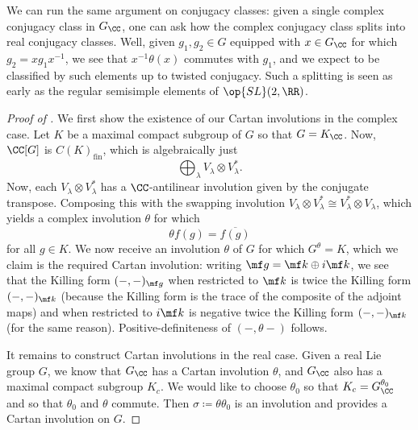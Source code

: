 \documentclass[../notes.tex]{subfiles}
\begin{document}
\begin{example}
	We can run the same argument on conjugacy classes: given a single complex conjugacy class in $G_\CC$, one can ask how the complex conjugacy class splits into real conjugacy classes. Well, given $g_1,g_2\in G$ equipped with $x\in G_\CC$ for which $g_2=xg_1x^{-1}$, we see that $x^{-1}\theta(x)$ commutes with $g_1$, and we expect to be classified by such elements up to twisted conjugacy. Such a splitting is seen as early as the regular semisimple elements of $\op{SL}(2,\RR)$.
\end{example}
\begin{proof}[Proof of ]
	We first show the existence of our Cartan involutions in the complex case. Let $K$ be a maximal compact subgroup of $G$ so that $G=K_\CC$. Now, $\CC[G]$ is $C(K)_{\mathrm{fin}}$, which is algebraically just
	\[\bigoplus_\lambda V_\lambda\otimes V_\lambda^*.\]
	Now, each $V_\lambda\otimes V_\lambda^*$ has a $\CC$-antilinear involution given by the conjugate transpose. Composing this with the swapping involution $V_\lambda\otimes V_\lambda^*\cong V_\lambda^*\otimes V_\lambda$, which yields a complex involution $\theta$ for which
	\[\theta f(g)=\overline{f(g)}\]
	for all $g\in K$. We now receive an involution $\theta$ of $G$ for which $G^\theta=K$, which we claim is the required Cartan involution: writing $\mf g=\mf k\oplus i\mf k$, we see that the Killing form $(-,-)_{\mf g}$ when restricted to $\mf k$ is twice the Killing form $(-,-)_{\mf k}$ (because the Killing form is the trace of the composite of the adjoint maps) and when restricted to $i\mf k$ is negative twice the Killing form $(-,-)_{\mf k}$ (for the same reason). Positive-definiteness of $(-,\theta-)$ follows.

	It remains to construct Cartan involutions in the real case. Given a real Lie group $G$, we know that $G_\CC$ has a Cartan involution $\theta$, and $G_\CC$ also has a maximal compact subgroup $K_c$. We would like to choose $\theta_0$ so that $K_c=G_\CC^{\theta_0}$ and so that $\theta_0$ and $\theta$ commute. Then $\sigma\coloneqq\theta\theta_0$ is an involution and provides a Cartan involution on $G$.


\end{proof}
\end{document}
